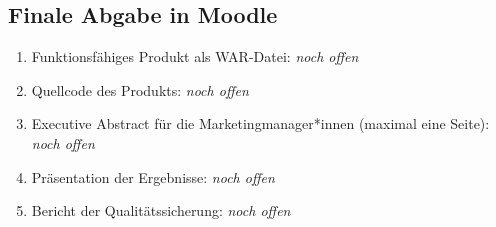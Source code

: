 \documentclass[a4paper,10pt]{article}
\newcommand{\offen}{\emph{noch offen}}
\begin{document}
\subsection*{Finale Abgabe in Moodle}
\begin{enumerate}
    \item Funktionsfähiges Produkt als WAR-Datei: \offen
    \item Quellcode des Produkts: \offen
    \item Executive Abstract für die Marketingmanager*innen (maximal eine Seite): \offen
    \item Präsentation der Ergebnisse: \offen
    \item Bericht der Qualitätssicherung: \offen
\end{enumerate}
\end{document}
